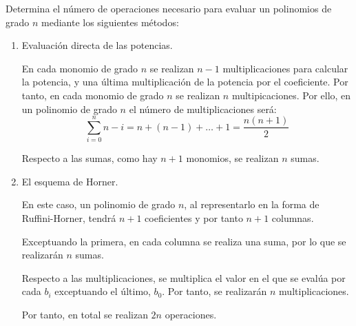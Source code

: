 \begin{ejercicio}
    Determina el número de operaciones necesario para evaluar un polinomios de grado $n$ mediante los siguientes métodos:
    \begin{enumerate}
        \item Evaluación directa de las potencias.
        
        En cada monomio de grado $n$ se realizan $n-1$ multiplicaciones para calcular la potencia, y una última multiplicación de la potencia por el coeficiente. Por tanto, en cada monomio de grado $n$ se realizan $n$ multipicaciones. Por ello, en un polinomio de grado $n$ el número de multiplicaciones será:
        \begin{equation*}
            \sum_{i=0}^n n-i = n + (n-1) + \dots + 1 = \frac{n(n+1)}{2}
        \end{equation*}

        Respecto a las sumas, como hay $n+1$ monomios, se realizan $n$ sumas.

        \item El esquema de Horner.
        
        En este caso, un polinomio de grado $n$, al representarlo en la forma de Ruffini-Horner, tendrá $n+1$ coeficientes y por tanto $n+1$ columnas.

        Exceptuando la primera, en cada columna se realiza una suma, por lo que se realizarán $n$ sumas.

        Respecto a las multiplicaciones, se multiplica el valor en el que se evalúa por cada $b_i$ exceptuando el último, $b_0$. Por tanto, se realizarán $n$ multiplicaciones.

        Por tanto, en total se realizan $2n$ operaciones.
    \end{enumerate}
\end{ejercicio}
